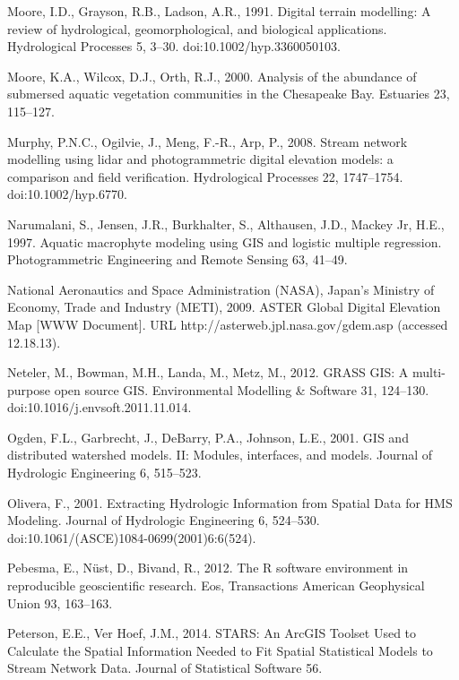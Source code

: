 \begin{thebibliography}
\bibitem{} \hangindent=1cm Moore, I.D., Grayson, R.B., Ladson, A.R., 1991. Digital terrain modelling: A review of hydrological, geomorphological, and biological applications. Hydrological Processes 5, 3–30. doi:10.1002/hyp.3360050103.

\bibitem{} \hangindent=1cm Moore, K.A., Wilcox, D.J., Orth, R.J., 2000. Analysis of the abundance of submersed aquatic vegetation communities in the Chesapeake Bay. Estuaries 23, 115–127.

\bibitem{} \hangindent=1cm Murphy, P.N.C., Ogilvie, J., Meng, F.-R., Arp, P., 2008. Stream network modelling using lidar and photogrammetric digital elevation models: a comparison and field verification. Hydrological Processes 22, 1747–1754. doi:10.1002/hyp.6770.

\bibitem{} \hangindent=1cm Narumalani, S., Jensen, J.R., Burkhalter, S., Althausen, J.D., Mackey Jr, H.E., 1997. Aquatic macrophyte modeling using GIS and logistic multiple regression. Photogrammetric Engineering and Remote Sensing 63, 41–49.

\bibitem{} \hangindent=1cm National Aeronautics and Space Administration (NASA), Japan’s Ministry of Economy, Trade and Industry (METI), 2009. ASTER Global Digital Elevation Map [WWW Document]. URL http://asterweb.jpl.nasa.gov/gdem.asp (accessed 12.18.13).

\bibitem{} \hangindent=1cm Neteler, M., Bowman, M.H., Landa, M., Metz, M., 2012. GRASS GIS: A multi-purpose open source GIS. Environmental Modelling & Software 31, 124–130. doi:10.1016/j.envsoft.2011.11.014.

\bibitem{} \hangindent=1cm Ogden, F.L., Garbrecht, J., DeBarry, P.A., Johnson, L.E., 2001. GIS and distributed watershed models. II: Modules, interfaces, and models. Journal of Hydrologic Engineering 6, 515–523.

\bibitem{} \hangindent=1cm Olivera, F., 2001. Extracting Hydrologic Information from Spatial Data for HMS Modeling. Journal of Hydrologic Engineering 6, 524–530. doi:10.1061/(ASCE)1084-0699(2001)6:6(524).

\bibitem{} \hangindent=1cm Pebesma, E., Nüst, D., Bivand, R., 2012. The R software environment in reproducible geoscientific research. Eos, Transactions American Geophysical Union 93, 163–163.

\bibitem{} \hangindent=1cm Peterson, E.E., Ver Hoef, J.M., 2014. STARS: An ArcGIS Toolset Used to Calculate the Spatial Information Needed to Fit Spatial Statistical Models to Stream Network Data. Journal of Statistical Software 56.


\end{thebibliography}
